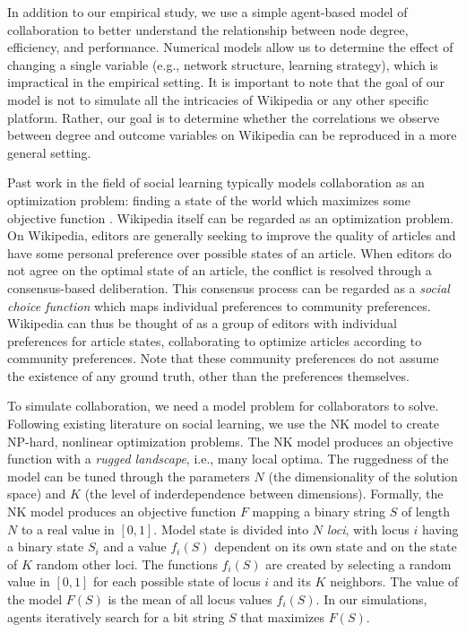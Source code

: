 In addition to our empirical study,
we use a simple agent-based model of collaboration to better understand
the relationship between node degree, efficiency, and performance.
Numerical models allow us to determine the effect of changing a single
variable (e.g., network structure, learning strategy),
which is impractical in the empirical setting.
It is important to note that the goal of our model is not to simulate
all the intricacies of Wikipedia or any other specific platform.
Rather, our goal is to determine whether the correlations we observe
between degree and outcome variables
on Wikipedia can be reproduced in a more general setting.

Past work in the field of social learning typically models collaboration
as an optimization problem:
finding a state of the world which maximizes some objective function
\cite{lazer_network_2007,mason_propagation_2008,mason_collaborative_2012,barkoczi_social_2016}.
Wikipedia itself can be regarded as an optimization problem.
On Wikipedia, editors are generally seeking to improve the quality of articles
and have some personal preference over possible states of an article.
When editors do not agree on the optimal state of an article,
the conflict is resolved through a consensus-based deliberation.
This consensus process can be regarded as a {\em social choice function}
\cite{arrow_social_2012,brandt_computational_2012}
which maps individual preferences to community preferences.
Wikipedia can thus be thought of as a group of editors with individual preferences
for article states,
collaborating to optimize articles according to community preferences.
Note that these community preferences do not assume the existence of any
ground truth, other than the preferences themselves.

To simulate collaboration, we need a model problem for collaborators to solve.
Following existing literature on social learning,
we use the NK model \cite{kauffman_towards_1987}
to create NP-hard, nonlinear optimization problems.
The NK model produces an objective function with a
{\em rugged landscape}, i.e., many local optima.
The ruggedness of the model can be tuned through the parameters $N$
(the dimensionality of the solution space)
and $K$ (the level of inderdependence between dimensions).
Formally, the NK model produces an objective function $F$ mapping a binary string $S$ of length
$N$ to a real value in $[0,1]$.
Model state is divided into $N$ {\em loci}, with locus $i$ having a binary state $S_i$
and a value $f_i(S)$ dependent on its own state
and on the state of $K$ random other loci.
The functions $f_i(S)$ are created by selecting a random value in $[0,1]$ for
each possible state of locus $i$ and its $K$ neighbors.
The value of the model $F(S)$ is the mean of all locus values $f_i(S)$.
In our simulations,
agents iteratively search for a bit string $S$ that maximizes $F(S)$.

